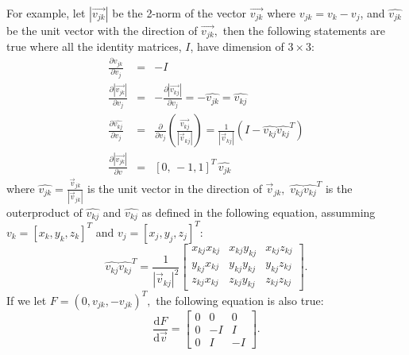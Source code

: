 \documentclass[11pt]{article}
\newcommand{\Vv}[1]{\mbox{$\vec{v}_{#1}$}}
\newcommand{\hatv}[1]{\mbox{$\hat{{v}_{#1}}$}}
\newcommand{\AbsVv}[1]{\mbox{$\left| \vec{v}_{#1} \right| $}}
\begin{document}
For example, let $\left|\vec{v_{jk}}\right|$ be
the 2-norm of the vector $\vec{v_{jk}}$ where 
$v_{jk}= v_k - v_j$, and $\hat{v_{jk}}$ be the unit
vector with the direction of $\vec{v_{jk}},$ 
then the following statements are true where all the identity
matrices, $I$, have dimension of $3\times3:$
\begin{eqnarray}
\label{eg1}
\frac{\partial v_{jk}}{\partial{v_j}} &=& -I \\
\label{eg2}
\frac{\partial 
\left|\vec{v_{jk}}\right|}
{\partial{v_j}} &=& 
-\frac{\partial 
\left|\vec{v_{kj}}\right|}
{\partial{v_j}} =
 - \hat{v_{jk}} = \hat{v_{kj}}\\
\label{eg3}
\frac{\partial \hatv{kj}}
{\partial{v_j}} &=& \frac{\partial}{\partial{v_j}}
\left(  
\frac{\vec{v_{kj}}}{\AbsVv{kj}} \right) =  \frac{1}{\AbsVv{kj}}
(I - \hatv{kj}\hatv{kj}^T)\\
\label{eg4}
\frac{\partial 
\left|\vec{v_{jk}}\right|}
{\partial{v}} &=& [0,\,-1,1]^T \, \hat{v_{jk}}
\end{eqnarray}
where $\hatv{jk} = \frac{\Vv{jk}}{\AbsVv{jk}}$ is the unit vector in
the direction of $\Vv{jk},$ $\hatv{kj}\hatv{kj}^T$ is the outerproduct 
of $\hatv{kj}$ and $\hatv{kj}$ as defined in the following equation,
assumming $v_k = [x_k, y_k, z_k]^T$ and $v_j = [x_j,y_j, z_j]^T:$
\begin{equation}
\hatv{kj}\hatv{kj}^T
= \frac{1}{\AbsVv{kj}^2}\left[ \begin{array}{ccc}
x_{kj} x_{kj}  & x_{kj} y_{kj}  & x_{kj} z_{kj} \\
y_{kj} x_{kj}  & y_{kj} y_{kj}  & y_{kj} z_{kj} \\
z_{kj} x_{kj}  & z_{kj} y_{kj}  & z_{kj} z_{kj} 
\end{array}
\right].
\end{equation}
If we let $F = (0, v_{jk}, -v_{jk})^T,$ the following equation is also true:
\begin{equation}
\label{eg5}
\frac{\mathrm{d} F}{\mathrm{d}\vec{v}}
= \left[ \begin{array}{ccc}
0 & 0 & 0\\
0 & -I & I\\
0 & I & -I
\end{array}
\right].
\end{equation}
\end{document}
